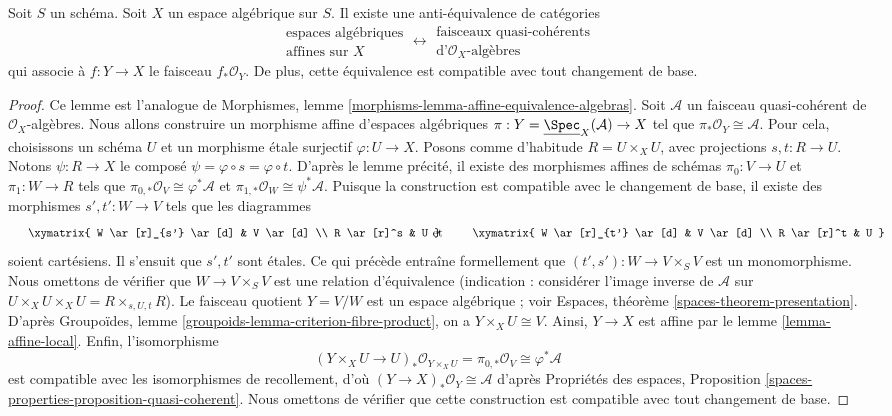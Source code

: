 \begin{lemma}
\label{lemma-affine-equivalence-algebras}
Soit $S$ un schéma. Soit $X$ un espace algébrique sur $S$.
Il existe une anti-équivalence de catégories
$$
\begin{matrix}
\text{espaces algébriques} \\
\text{affines sur }X
\end{matrix}
\longleftrightarrow
\begin{matrix}
\text{faisceaux quasi-cohérents} \\
\text{d'}\mathcal{O}_X\text{-algèbres}
\end{matrix}
$$
qui associe à $f : Y \to X$ le faisceau $f_*\mathcal{O}_Y$.
De plus, cette équivalence est compatible avec tout changement de base.
\end{lemma}

\begin{proof}
Ce lemme est l'analogue de Morphismes, lemme
\ref{morphisms-lemma-affine-equivalence-algebras}.
Soit $\mathcal{A}$ un faisceau quasi-cohérent de $\mathcal{O}_X$-algèbres.
Nous allons construire un morphisme affine d'espaces algébriques
$\pi : Y = \underline{\Spec}_X(\mathcal{A}) \to X$ tel que
$\pi_*\mathcal{O}_Y \cong \mathcal{A}$. Pour cela, choisissons un schéma
$U$ et un morphisme étale surjectif $\varphi : U \to X$. Posons comme d'habitude
$R = U \times_X U$, avec projections $s, t : R \to U$. Notons
$\psi : R \to X$ le composé $\psi = \varphi \circ s = \varphi \circ t$.
D'après le lemme précité, il existe des morphismes affines de schémas
$\pi_0 : V \to U$ et $\pi_1 : W \to R$ tels que
$\pi_{0, *}\mathcal{O}_V \cong \varphi^*\mathcal{A}$ et
$\pi_{1, *}\mathcal{O}_W \cong \psi^*\mathcal{A}$.
Puisque la construction est compatible avec le changement de base, il existe
des morphismes $s', t' : W \to V$ tels que les diagrammes
$$
\vcenter{
\xymatrix{
W \ar[r]_{s'} \ar[d] & V \ar[d] \\
R \ar[r]^s & U
}
}
\quad\text{et}\quad
\vcenter{
\xymatrix{
W \ar[r]_{t'} \ar[d] & V \ar[d] \\
R \ar[r]^t & U
}
}
$$
soient cartésiens. Il s'ensuit que $s', t'$ sont étales. Ce qui précède entraîne
formellement que $(t', s') : W \to V \times_S V$ est un
monomorphisme. Nous omettons de vérifier que $W \to V \times_S V$ est une
relation d'équivalence (indication : considérer l'image inverse de $\mathcal{A}$
sur $U \times_X U \times_X U = R \times_{s, U, t} R$).
Le faisceau quotient $Y = V/W$
est un espace algébrique ; voir
Espaces, théorème \ref{spaces-theorem-presentation}.
D'après Groupoïdes, lemme \ref{groupoids-lemma-criterion-fibre-product},
on a $Y \times_X U \cong V$. Ainsi, $Y \to X$ est affine par le
lemme \ref{lemma-affine-local}. Enfin, l'isomorphisme
$$
(Y \times_X U \to U)_*\mathcal{O}_{Y \times_X U} =
\pi_{0, *}\mathcal{O}_V \cong \varphi^*\mathcal{A}
$$
est compatible avec les isomorphismes de recollement, d'où
$(Y \to X)_*\mathcal{O}_Y \cong \mathcal{A}$ d'après
Propriétés des espaces, Proposition
\ref{spaces-properties-proposition-quasi-coherent}.
Nous omettons de vérifier que cette construction est compatible avec tout
changement de base.
\end{proof}

